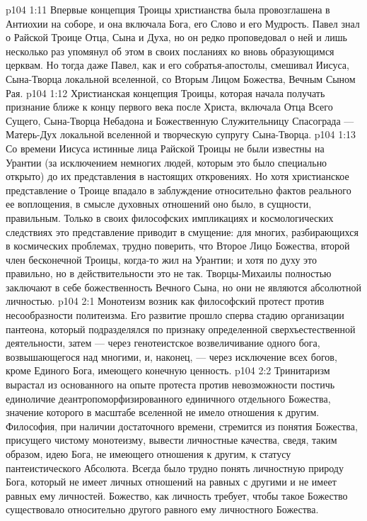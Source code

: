 \vs p104 1:11 Впервые концепция Троицы христианства была провозглашена в Антиохии на соборе, и она включала Бога, его Слово и его Мудрость. Павел знал о Райской Троице Отца, Сына и Духа, но он редко проповедовал о ней и лишь несколько раз упомянул об этом в своих посланиях ко вновь образующимся церквам. Но тогда даже Павел, как и его собратья\hyp{}апостолы, смешивал Иисуса, Сына\hyp{}Творца локальной вселенной, со Вторым Лицом Божества, Вечным Сыном Рая.
\vs p104 1:12 Христианская концепция Троицы, которая начала получать признание ближе к концу первого века после Христа, включала Отца Всего Сущего, Сына\hyp{}Творца Небадона и Божественную Служительницу Спасограда --- Матерь\hyp{}Дух локальной вселенной и творческую супругу Сына\hyp{}Творца.
\vs p104 1:13 Со времени Иисуса истинные лица Райской Троицы не были известны на Урантии (за исключением немногих людей, которым это было специально открыто) до их представления в настоящих откровениях. Но хотя христианское представление о Троице впадало в заблуждение относительно фактов реального ее воплощения, в смысле духовных отношений оно было, в сущности, правильным. Только в своих философских импликациях и космологических следствиях это представление приводит в смущение: для многих, разбирающихся в космических проблемах, трудно поверить, что Второе Лицо Божества, второй член бесконечной Троицы, когда\hyp{}то жил на Урантии; и хотя по духу это правильно, но в действительности это не так. Творцы\hyp{}Михаилы полностью заключают в себе божественность Вечного Сына, но они не являются абсолютной личностью.
\vs p104 2:1 Монотеизм возник как философский протест против несообразности политеизма. Его развитие прошло сперва стадию организации пантеона, который подразделялся по признаку определенной сверхъестественной деятельности, затем --- через генотеистское возвеличивание одного бога, возвышающегося над многими, и, наконец, --- через исключение всех богов, кроме Единого Бога, имеющего конечную ценность.
\vs p104 2:2 Тринитаризм вырастал из основанного на опыте протеста против невозможности постичь единоличие деантропоморфизированного единичного отдельного Божества, значение которого в масштабе вселенной не имело отношения к другим. Философия, при наличии достаточного времени, стремится из понятия Божества, присущего чистому монотеизму, вывести личностные качества, сведя, таким образом, идею Бога, не имеющего отношения к другим, к статусу пантеистического Абсолюта. Всегда было трудно понять личностную природу Бога, который не имеет личных отношений на равных с другими и не имеет равных ему личностей. Божество, как личность требует, чтобы такое Божество существовало относительно другого равного ему личностного Божества.
